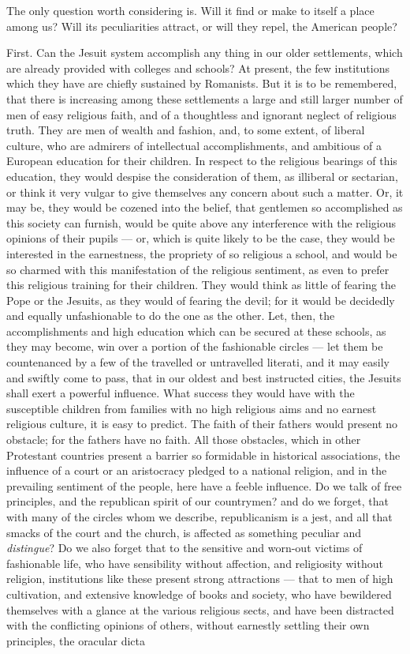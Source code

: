 \documentclass[]{book}
\begin{document}
The only question worth considering is. Will it find or make to itself a place among us? Will its peculiarities attract, or will they repel, the American people?

First. Can the Jesuit system accomplish any thing in our older settlements, which are already provided with colleges and schools? At present, the few institutions which they have are chiefly sustained by Romanists. But it is to be remembered, that there is increasing among these settlements a large and still larger number of men of easy religious faith, and of a thoughtless and ignorant neglect of religious truth. They are men of wealth and fashion, and, to some extent, of liberal culture, who are admirers of intellectual accomplishments, and ambitious of a European education for their children. In respect to the religious bearings of this education, they would despise the consideration of them, as illiberal or sectarian, or think it very vulgar to give themselves any concern about such a matter. Or, it may be, they would be cozened into the belief, that gentlemen so accomplished as this society can furnish, would be quite above any interference with the religious opinions of their pupils --- or, which is quite likely to be the case, they would be interested in the earnestness, the propriety of so religious a school, and would be so charmed with this manifestation of the religious sentiment, as even to prefer this religious training for their children. They would think as little of fearing the Pope or the Jesuits, as they would of fearing the devil; for it would be decidedly and equally unfashionable to do the one as the other. Let, then, the accomplishments and high education which can be secured at these schools, as they may become, win over a portion of the fashionable circles --- let them be countenanced by a few of the travelled or untravelled literati, and it may easily and swiftly come to pass, that in our oldest and best instructed cities, the Jesuits shall exert a powerful influence. What success they would have with the susceptible children from families with no high religious aims and no earnest religious culture, it is easy to predict. The faith of their fathers would present no obstacle; for the fathers have no faith. All those obstacles, which in other Protestant countries present a barrier so formidable in historical associations, the influence of a court or an aristocracy pledged to a national religion, and in the prevailing sentiment of the people, here have a feeble influence. Do we talk of free principles, and the republican spirit of our countrymen? and do we forget, that with many of the circles whom we describe, republicanism is a jest, and all that smacks of the court and the church, is affected as something peculiar and \emph{distingue}? Do we also forget that to the sensitive and worn-out victims of fashionable life, who have sensibility without affection, and religiosity without religion, institutions like these present strong attractions --- that to men of high cultivation, and extensive knowledge of books and society, who have bewildered themselves with a glance at the various religious sects, and have been distracted with the conflicting opinions of others, without earnestly settling their own principles, the oracular dicta 
\end{document}
